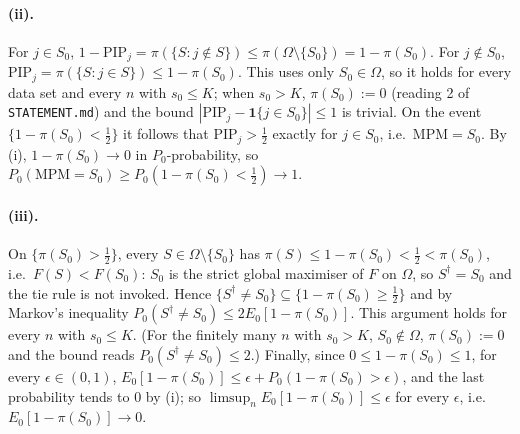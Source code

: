 \documentclass[11pt]{article}
\theoremstyle{definition}
\newcommand{\Pp}{P_0}
\newcommand{\E}{E_0}
\newcommand{\1}{\mathbf 1}
\begin{document}
\paragraph{(ii).} For $j\in S_0$, $1-\mathrm{PIP}_j=\pi(\{S:j\notin S\})\le\pi(\Omega\setminus\{S_0\})=1-\pi(S_0)$. For $j\notin S_0$, $\mathrm{PIP}_j=\pi(\{S:j\in S\})\le1-\pi(S_0)$. This uses only $S_0\in\Omega$, so it holds for every data set and every $n$ with $s_0\le K$; when $s_0>K$, $\pi(S_0):=0$ (reading 2 of \texttt{STATEMENT.md}) and the bound $|\mathrm{PIP}_j-\1\{j\in S_0\}|\le1$ is trivial. On the event $\{1-\pi(S_0)<\frac12\}$ it follows that $\mathrm{PIP}_j>\frac12$ exactly for $j\in S_0$, i.e.\ $\mathrm{MPM}=S_0$. By (i), $1-\pi(S_0)\to0$ in $\Pp$-probability, so $\Pp(\mathrm{MPM}=S_0)\ge\Pp(1-\pi(S_0)<\frac12)\to1$.

\paragraph{(iii).} On $\{\pi(S_0)>\frac12\}$, every $S\in\Omega\setminus\{S_0\}$ has $\pi(S)\le1-\pi(S_0)<\frac12<\pi(S_0)$, i.e.\ $F(S)<F(S_0)$: $S_0$ is the strict global maximiser of $F$ on $\Omega$, so $S^\dagger=S_0$ and the tie rule is not invoked. Hence $\{S^\dagger\ne S_0\}\subseteq\{1-\pi(S_0)\ge\frac12\}$ and by Markov's inequality $\Pp(S^\dagger\ne S_0)\le2\E[1-\pi(S_0)]$. This argument holds for every $n$ with $s_0\le K$. (For the finitely many $n$ with $s_0>K$, $S_0\notin\Omega$, $\pi(S_0):=0$ and the bound reads $\Pp(S^\dagger\ne S_0)\le2$.) Finally, since $0\le1-\pi(S_0)\le1$, for every $\epsilon\in(0,1)$, $\E[1-\pi(S_0)]\le\epsilon+\Pp(1-\pi(S_0)>\epsilon)$, and the last probability tends to $0$ by (i); so $\limsup_n\E[1-\pi(S_0)]\le\epsilon$ for every $\epsilon$, i.e.\ $\E[1-\pi(S_0)]\to0$.
\end{document}

